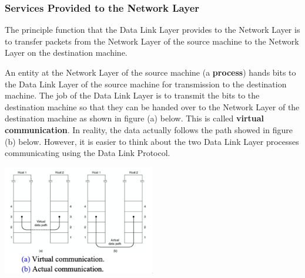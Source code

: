 \documentclass[11pt]{article}
\begin{document}
\subsubsection{Services Provided to the Network Layer}
The principle function that the Data Link Layer provides to the Network Layer is to transfer packets from the Network 
Layer of the source machine to the Network Layer on the destination machine. 

An entity at the Network Layer of the source machine (a \textbf{process}) hands bits to the Data Link Layer of the source 
machine for transmission to the destination machine. 
The job of the Data Link Layer is to transmit the bits to the destination machine so that they can be handed over to the 
Network Layer of the destination machine as shown in figure (a) below. 
This is called \textbf{virtual communication}. 
In reality, the data actually follows the path showed in figure (b) below. 
However, it is easier to think about the two Data Link Layer processes communicating using the Data Link Protocol. 
\begin{center}
    \includegraphics[width=0.5\textwidth]{servicesprovidedtonetworklayer1.png}
\end{center}
\end{document}
